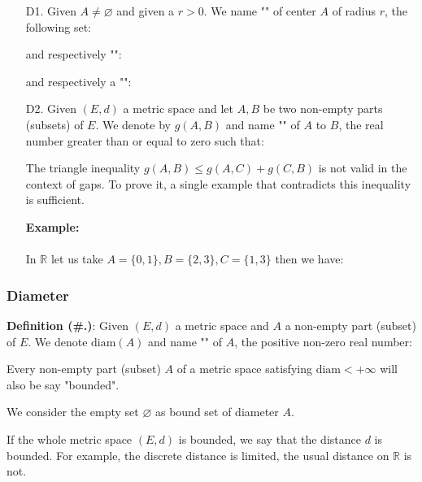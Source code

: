 	\begin{enumerate}
		\item[D1.] Given $A\neq \varnothing$ and given a $r>0$. We name "" of center $A$ of radius $r$, the following set:
		
		and respectively "":
		
		and respectively  a "":
		
		
		\item[D2.] Given $(E, d)$ a metric space and let $A, B$ be two non-empty parts (subsets) of $E$. We denote by $g (A, B)$ and name "" of $A$ to $B$, the real number greater than or equal to zero such that:
		
		\begin{tcolorbox}[title=Remark,arc=10pt,breakable,drop lifted shadow,
  skin=enhanced,
  skin first is subskin of={enhancedfirst}{arc=10pt,no shadow},
  skin middle is subskin of={enhancedmiddle}{arc=10pt,no shadow},
  skin last is subskin of={enhancedlast}{drop lifted shadow}]
		The triangle inequality $g(A,B)\leq g(A,C)+g(C,B)$ is not valid in the context of gaps. To prove it, a single example that contradicts this inequality is sufficient.
		\end{tcolorbox}
		\begin{tcolorbox}[colframe=black,colback=white,sharp corners]
		\textbf{{\Large {}}Example:}\\\\
		In $\mathbb{R}$ let us take $A=\{0,1\},B=\{2,3\},C=\{1,3\}$ then we have:
		
		\end{tcolorbox}	
	\end{enumerate}
	
	\subsubsection{Diameter}
	\textbf{Definition (\#\thesection.\mydef)}: Given $(E, d)$ a metric space and $A$ a non-empty part (subset) of $E$. We denote $\text{diam}(A)$ and name "" of $A$, the positive non-zero real number:
	
	Every non-empty part (subset) $A$ of a metric space satisfying $\text{diam}<+\infty$ will also be say "bounded".
	\begin{tcolorbox}[title=Remark,arc=10pt,breakable,drop lifted shadow,
  skin=enhanced,
  skin first is subskin of={enhancedfirst}{arc=10pt,no shadow},
  skin middle is subskin of={enhancedmiddle}{arc=10pt,no shadow},
  skin last is subskin of={enhancedlast}{drop lifted shadow}]
	We consider the empty set $\varnothing$ as bound set of diameter $A$.
	\end{tcolorbox}	
	If the whole metric space $(E,d)$ is bounded, we say that the distance $d$ is bounded. For example, the discrete distance is limited, the usual distance on $\mathbb{R}$ is not.
	
